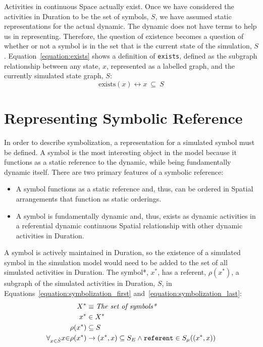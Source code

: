 Activities in continuous Space actually exist.  Once we have
considered the activities in Duration to be the set of symbols, $S$,
we have assumed static representations for the actual dynamic.  The
dynamic does not have terms to help us in representing.  Therefore,
the question of existence becomes a question of whether or not a
symbol is in the set that is the current state of the simulation, $S$.
Equation~\ref{equation:exists} shows a definition of {\tt exists},
defined as the subgraph relationship between any state, $x$,
represented as a labelled graph, and the currently simulated state
graph, $S$:
\begin{equation}
\label{equation:exists}
\text{exists}(x) \longleftrightarrow x ~{\subseteq}~ S
\end{equation}

\section{Representing Symbolic Reference}

In order to describe symbolization, a representation for a simulated
symbol must be defined.  A symbol is the most interesting object in
the model because it functions as a static reference to the dynamic,
while being fundamentally dynamic itself.  There are two primary
features of a symbolic reference:
\begin{itemize}
\item A symbol functions as a static reference and, thus, can be
  ordered in Spatial arrangements that function as static orderings.
\item A symbol is fundamentally dynamic and, thus, exists as dynamic
  activities in a referential dynamic continuous Spatial relationship
  with other dynamic activities in Duration.
\end{itemize}
A symbol is actively maintained in Duration, so the existence of a
simulated symbol in the simulation model would need to be added to the
set of all simulated activities in Duration.  The symbol*, $x^*$, has
a referent, $\rho(x^*)$, a subgraph of the simulated activities in
Duration, $S$, in Equations~\ref{equation:symbolization_first}
and~\ref{equation:symbolization_last}:
\begin{align}
\label{equation:symbolization_first}
                                       X^* &\equiv \text{\emph{The set of symbols*}} \\
                                       x^* &\in X^* \\
                                 \rho(x^*) &\subseteq S \\
 \forall_{x{\in}\mathring{S}} x{\in}\rho(x^*) &\rightarrow (x^*, x) \subseteq S_E \wedge \text{\tt{referent}} \in S_\mu((x^*, x))
\label{equation:symbolization_last}
\end{align}

